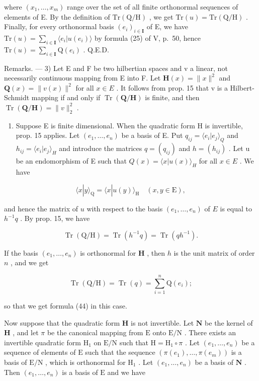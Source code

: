 where \((x_{1},\ldots ,x_{m})\) range over the set of all finite orthonormal sequences of elements of E. By the definition of \(\mathrm{Tr}(\mathrm{Q / H})\) , we get \(\mathrm{Tr}(u) = \mathrm{Tr}(\mathrm{Q / H})\) . Finally, for every orthonormal basis \((e_i)_{i\in \mathbf{I}}\) of E, we have \(\mathrm{Tr}(u) = \sum_{i\in \mathbf{I}}\langle e_i|u(e_i)\rangle\) by formula (25) of V, p.~50, hence \(\mathrm{Tr}(u) = \sum_{i\in \mathbf{I}}\mathrm{Q}(e_i)\) . Q.E.D.

Remarks. --- 3) Let E and F be two hilbertian spaces and v a linear, not necessarily continuous mapping from E into F. Let \(\mathbf{H}(x)=\|x\|^{2}\) and \(\mathbf{Q}(x)=\|v(x)\|^{2}\) for all \(x\in E\) . It follows from prop. 15 that v is a Hilbert-Schmidt mapping if and only if \(\operatorname{Tr}(\mathbf{Q}/\mathbf{H})\) is finite, and then \(\operatorname{Tr}(\mathbf{Q}/\mathbf{H})=\|v\|_{2}^{2}\) .

\begin{enumerate}
\def\labelenumi{\arabic{enumi})}
\setcounter{enumi}{3}
\tightlist
\item
  Suppose E is finite dimensional. When the quadratic form H is invertible, prop. 15 applies. Let \((e_{1}, \ldots, e_{n})\) be a basis of E. Put \(q_{ij} = \langle e_{i}|e_{j} \rangle_{Q}\) and \(h_{ij} = \langle e_{i}|e_{j} \rangle_{H}\) and introduce the matrices \(q = (q_{ij})\) and \(h = (h_{ij})\) . Let u be an endomorphism of E such that \(Q(x) = \langle x|u(x) \rangle_{H}\) for all \(x \in E\) . We have
\end{enumerate}

\[
\langle x | y \rangle_ {\mathrm{Q}} = \langle x | u (y) \rangle_ {\mathrm{H}} \quad (x, y \in \mathrm{E}),
\]

and hence the matrix of \(u\) with respect to the basis \((e_1, \ldots, e_n)\) of \(E\) is equal to \(h^{-1}q\) . By prop. 15, we have

\[
\operatorname{Tr} (\mathrm{Q} / \mathrm{H}) = \operatorname{Tr} (h ^ {- 1} q) = \operatorname{Tr} (q h ^ {- 1}).\tag{45}
\]

If the basis \((e_1, \dots, e_n)\) is orthonormal for \(\mathbf{H}\) , then \(h\) is the unit matrix of order \(n\) , and we get

\[
\operatorname{Tr} (\mathrm{Q} / \mathrm{H}) = \operatorname{Tr} (q) = \sum_ {i = 1} ^ {n} \mathrm{Q} (e _ {i});
\]

so that we get formula (44) in this case.

Now suppose that the quadratic form \(\mathbf{H}\) is not invertible. Let \(\mathbf{N}\) be the kernel of \(\mathbf{H}\) , and let \(\pi\) be the canonical mapping from \(\mathrm{E}\) onto \(\mathrm{E} / \mathrm{N}\) . There exists an invertible quadratic form \(\mathrm{H}_1\) on \(\mathrm{E} / \mathrm{N}\) such that \(\mathrm{H} = \mathrm{H}_1 \circ \pi\) . Let \((e_1, \dots, e_n)\) be a sequence of elements of \(\mathrm{E}\) such that the sequence \((\pi(e_1), \dots, \pi(e_m))\) is a basis of \(\mathrm{E} / \mathrm{N}\) , which is orthonormal for \(\mathrm{H}_1\) . Let \((e_1, \dots, e_n)\) be a basis of \(\mathbf{N}\) . Then \((e_1, \dots, e_n)\) is a basis of \(\mathrm{E}\) and we have

